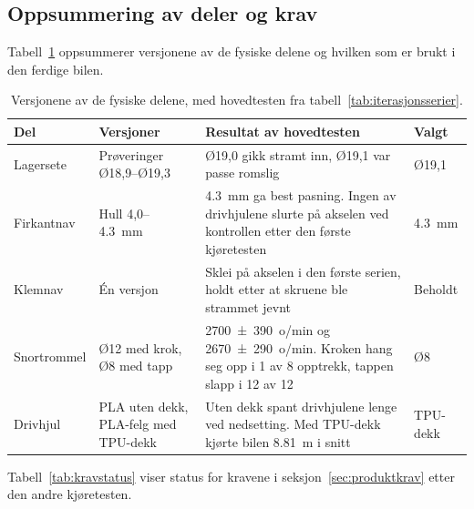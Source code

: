 \subsection{Oppsummering av deler og krav}
\label{sec:res-kravstatus}
Tabell~\ref{tab:deler-samlet} oppsummerer versjonene av de fysiske delene og hvilken som er brukt i den ferdige bilen.

\begin{table}[H]
    \centering
    \caption[Versjonene av de fysiske delene]{Versjonene av de fysiske delene, med hovedtesten fra tabell~\ref{tab:iterasjonsserier}.}
    \label{tab:deler-samlet}
    \small
    \renewcommand{\arraystretch}{1.3}
    \begin{tabular}{|p{2.1cm}|p{2.9cm}|p{6.3cm}|p{1.8cm}|}
        \hline
        \textbf{Del} & \textbf{Versjoner} & \textbf{Resultat av hovedtesten} & \textbf{Valgt} \\
        \hline
        Lagersete & Prøveringer Ø18,9--Ø19,3 & Ø19,0 gikk stramt inn, Ø19,1 var passe romslig & Ø19,1 \\
        \hline
        Firkantnav & Hull 4,0--\SI{4,3}{mm} & \SI{4,3}{mm} ga best pasning. Ingen av drivhjulene slurte på akselen ved kontrollen etter den første kjøretesten & \SI{4,3}{mm} \\
        \hline
        Klemnav & Én versjon & Sklei på akselen i den første serien, holdt etter at skruene ble strammet jevnt & Beholdt \\
        \hline
        Snortrommel & Ø12 med krok, Ø8 med tapp & \SI[separate-uncertainty=true]{2700 \pm 390}{o/min} og \SI[separate-uncertainty=true]{2670 \pm 290}{o/min}. Kroken hang seg opp i 1 av 8 opptrekk, tappen slapp i 12 av 12 & Ø8 \\
        \hline
        Drivhjul & PLA uten dekk, PLA-felg med TPU-dekk & Uten dekk spant drivhjulene lenge ved nedsetting. Med TPU-dekk kjørte bilen \SI{8,81}{m} i snitt & TPU-dekk \\
        \hline
    \end{tabular}
\end{table}

Tabell~\ref{tab:kravstatus} viser status for kravene i seksjon~\ref{sec:produktkrav} etter den andre kjøretesten.


